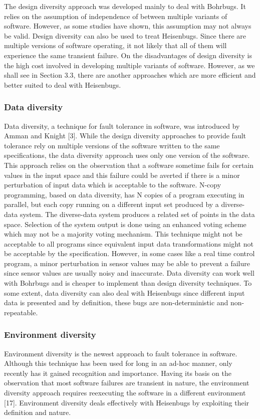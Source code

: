 \documentclass[a4paper, 11pt]{article}
\begin{document}
The design diversity approach was developed mainly to deal with Bohrbugs. It relies on the assumption of independence of between multiple variants of software. However, as some studies have shown, this assumption may not always be valid. Design diversity can also be used to treat Heisenbugs. Since there are multiple versions of software operating, it not likely that all of them will experience the same transient failure. On the disadvantages of design diversity is the high cost involved in developing multiple variants of software. However, as we shall see in Section 3.3, there are another approaches which are more efficient and better suited to deal with Heisenbugs.

\subsubsection{Data diversity}
Data diversity, a technique for fault tolerance in software, was introduced by Amman and Knight [3]. While the design diversity approaches to provide fault tolerance rely on multiple versions of the software written to the same specifications, the data diversity approach uses only one version of the software. This approach relies on the observation that a software sometime fails for certain values in the input space and this failure could be averted if there is a minor perturbation of input data which is acceptable to the software. N-copy programming, based on data diversity, has N copies of a program executing in parallel, but each copy running on a different input set produced by a diverse-data system. The diverse-data system produces a related set of points in the data space. Selection of the system output is done using an enhanced voting scheme which may not be a majority voting mechanism. This technique might not be acceptable to all programs since equivalent input data transformations might not be acceptable by the specification. However, in some cases like a real time control program, a minor perturbation in sensor values may be able to prevent a failure since sensor values are usually noisy and inaccurate.
Data diversity can work well with Bohrbugs and is cheaper to implement than design diversity techniques. To some extent, data diversity can also deal with Heisenbugs since different input data is presented and by definition, these bugs are non-deterministic and non-repeatable.

\subsubsection{Environment diversity}
Environment diversity is the newest approach to fault tolerance in software. Although this technique has been used for long in an ad-hoc manner, only recently has it gained recognition and importance. Having its basis on the observation that most software failures are transient in nature, the environment diversity approach requires reexecuting the software in a different environment [17]. Environment diversity deals effectively with Heisenbugs by exploiting their definition and nature.
\end{document}
